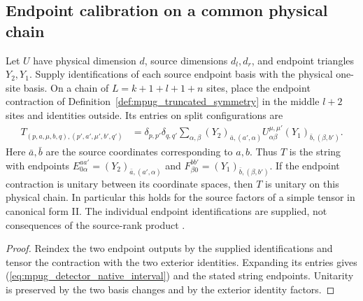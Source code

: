 \subsection{Endpoint calibration on a common physical chain}

\begin{lemma}
    \label{lem:mpug_detector_native_interval}
    Let $U$ have physical dimension $d$, source dimensions $d_l,d_r$,
    and endpoint triangles $Y_2,Y_1$. Supply identifications of each
    source endpoint basis with the physical one-site basis. On a chain of
    $L=k+1+l+1+n$ sites, place the endpoint contraction of
    Definition~\ref{def:mpug_truncated_symmetry} in the middle $l+2$
    sites and identities outside. Its entries on split configurations are
    \begin{align}
        T_{(p,a,\mu,b,q),(p',a',\mu',b',q')}
         & =\delta_{p,p'}\delta_{q,q'}
        \sum_{\alpha,\beta}(Y_2)_{\bar a,(a',\alpha)}
        U^{\mu,\mu'}_{\alpha\beta}(Y_1)_{\bar b,(\beta,b')}.
        \label{eq:mpug_detector_native_interval}
    \end{align}
    Here $\bar a,\bar b$ are the source coordinates corresponding to
    $a,b$. Thus $T$ is the string with endpoints
    $E^{aa'}_{0\alpha}=(Y_2)_{\bar a,(a',\alpha)}$ and
    $F^{bb'}_{\beta0}=(Y_1)_{\bar b,(\beta,b')}$.
    If the endpoint contraction is unitary between its coordinate spaces,
    then $T$ is unitary on this physical chain. In particular this holds
    for the source factors of a simple tensor in canonical form II.
    The individual endpoint identifications are supplied, not consequences
    of the source-rank product
    \cite{gap:fbc25_truncated_symmetry_endpoint_unitarity_scope}.
\end{lemma}

\begin{proof}
    Reindex the two endpoint outputs by the supplied identifications and
    tensor the contraction with the two exterior identities. Expanding
    its entries gives (\ref{eq:mpug_detector_native_interval}) and the
    stated string endpoints. Unitarity is preserved by the two basis
    changes and by the exterior identity factors.
\end{proof}

